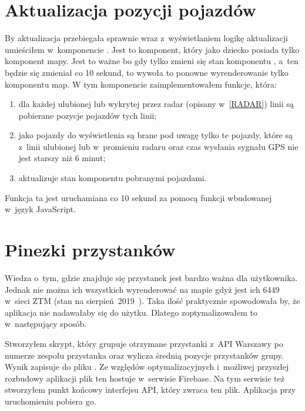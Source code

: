 \documentclass{SGGW-thesis}
\begin{document}
\section{Aktualizacja pozycji pojazdów}
By aktualizacja przebiegała sprawnie wraz z~wyświetlaniem logikę aktualizacji umieściłem w~komponencie .
Jest to komponent, który jako dziecko posiada tylko komponent mapy.
Jest to ważne bo gdy tylko zmieni się stan komponentu , a~ten będzie się zmieniał co 10 sekund, to wywoła to ponowne wyrenderowanie tylko komponentu map.
W tym komponencie zaimplementowałem funkcje, która:
\begin{enumerate}
  \item{dla każdej ulubionej lub wykrytej przez radar (opisany w~\ref{RADAR}) linii są pobierane pozycje pojazdów tych linii;}
  \item{jako pojazdy do wyświetlenia są brane pod uwagę tylko te pojazdy, które są z~linii ulubionej lub w~promieniu radaru oraz czas wysłania sygnału GPS nie jest starszy niż 6 minut;}
  \item{aktualizuje stan komponentu  pobranymi pojazdami.}
\end{enumerate}
Funkcja ta jest uruchamiana co 10 sekund za pomocą funkcji  wbudowanej w~język JavaScript.

\section{Pinezki przystanków}
Wiedza o~tym, gdzie znajduje się przystanek jest bardzo ważna dla użytkownika.
Jednak nie można ich wszystkich wyrenderować na mapie gdyż jest ich 6449 w~sieci ZTM (stan na sierpień~2019~\cite{ZTMSTATS}).
Taka ilość praktycznie spowodowała by, że aplikacja nie nadawałaby się do użytku.
Dlatego zoptymalizowałem to w~następujący sposób.

\label{FIREBASE}
Stworzyłem skrypt, który grupuje otrzymane przystanki z~API Warszawy po numerze zespołu przystanka oraz wylicza średnią pozycje przystanków grupy.
Wynik zapisuje do pliku .
Ze względów optymalizacyjnych i~możliwej przyszłej rozbudowy aplikacji plik ten hostuje w~serwisie Firebase.
Na tym serwisie też stworzyłem punkt końcowy interfejsu API, który zwraca ten plik.
Aplikacja przy uruchomieniu pobiera go.
\end{document}
